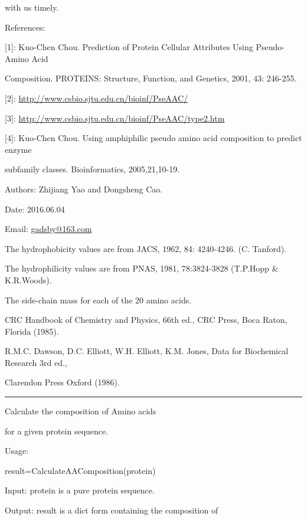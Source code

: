 \documentclass[letterpaper,10pt,english]{sphinxmanual}
\begin{document}
with us timely.

References:

{[}1{]}: Kuo-Chen Chou. Prediction of Protein Cellular Attributes Using Pseudo-Amino Acid

Composition. PROTEINS: Structure, Function, and Genetics, 2001, 43: 246-255.

{[}2{]}: \url{http://www.csbio.sjtu.edu.cn/bioinf/PseAAC/}

{[}3{]}: \url{http://www.csbio.sjtu.edu.cn/bioinf/PseAAC/type2.htm}

{[}4{]}: Kuo-Chen Chou. Using amphiphilic pseudo amino acid composition to predict enzyme

subfamily classes. Bioinformatics, 2005,21,10-19.

Authors: Zhijiang Yao and Dongsheng Cao.

Date: 2016.06.04

Email: \href{mailto:gadsby@163.com}{gadsby@163.com}

The hydrophobicity values are from JACS, 1962, 84: 4240-4246. (C. Tanford).

The hydrophilicity values are from PNAS, 1981, 78:3824-3828 (T.P.Hopp \& K.R.Woods).

The side-chain mass for each of the 20 amino acids.

CRC Handbook of Chemistry and Physics, 66th ed., CRC Press, Boca Raton, Florida (1985).

R.M.C. Dawson, D.C. Elliott, W.H. Elliott, K.M. Jones, Data for Biochemical Research 3rd ed.,

Clarendon Press Oxford (1986).


\bigskip\hrule{}\bigskip


\begin{fulllineitems}
\label{reference/PseudoAAC:PseudoAAC.GetAAComposition}
Calculate the composition of Amino acids

for a given protein sequence.

Usage:

result=CalculateAAComposition(protein)

Input: protein is a pure protein sequence.

Output: result is a dict form containing the composition of

\end{fulllineitems}
\end{document}
